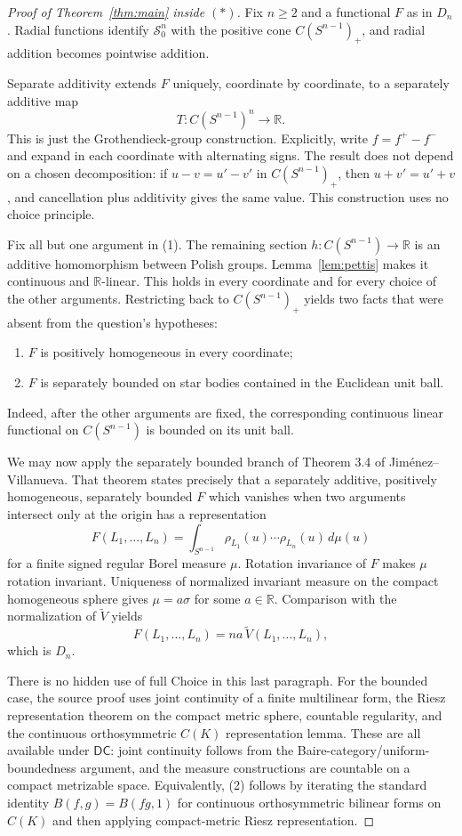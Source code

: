 \documentclass[11pt]{article}
\newcommand{\DC}{\mathsf{DC}}
\newcommand{\R}{\mathbb R}
\newcommand{\Sph}{S^{n-1}}
\newcommand{\C}{C(\Sph)}
\newcommand{\Vt}{\widetilde V}
\begin{document}
\begin{proof}[Proof of Theorem~\ref{thm:main} inside $(\ast)$]
Fix $n\ge2$ and a functional $F$ as in $D_n$.  Radial functions identify
$\mathcal S_0^n$ with the positive cone $\C_+$, and radial addition becomes
pointwise addition.

Separate additivity extends $F$ uniquely, coordinate by coordinate, to a
separately additive map
\[
 T:\C^n\longrightarrow\R.                                      \tag{1}
\]
This is just the Grothendieck-group construction.  Explicitly, write
$f=f^+-f^-$ and expand in each coordinate with alternating signs.  The result
does not depend on a chosen decomposition: if $u-v=u'-v'$ in $\C_+$, then
$u+v'=u'+v$, and cancellation plus additivity gives the same value.  This
construction uses no choice principle.

Fix all but one argument in (1).  The remaining section $h:\C\to\R$ is an
additive homomorphism between Polish groups.  Lemma~\ref{lem:pettis} makes it
continuous and $\R$-linear.  This holds in every coordinate and for every
choice of the other arguments.  Restricting back to $\C_+$ yields two facts
that were absent from the question's hypotheses:
\begin{enumerate}
\item $F$ is positively homogeneous in every coordinate;
\item $F$ is separately bounded on star bodies contained in the Euclidean
unit ball.
\end{enumerate}
Indeed, after the other arguments are fixed, the corresponding continuous
linear functional on $\C$ is bounded on its unit ball.

We may now apply the separately bounded branch of Theorem 3.4 of
Jim\'enez--Villanueva.  That theorem states precisely that a separately
additive, positively homogeneous, separately bounded $F$ which vanishes when
two arguments intersect only at the origin has a representation
\[
 F(L_1,\ldots,L_n)
   =\int_{\Sph}\rho_{L_1}(u)\cdots\rho_{L_n}(u)\,d\mu(u)          \tag{2}
\]
for a finite signed regular Borel measure $\mu$.  Rotation invariance of $F$
makes $\mu$ rotation invariant.  Uniqueness of normalized invariant measure
on the compact homogeneous sphere gives $\mu=a\sigma$ for some $a\in\R$.
Comparison with the normalization of $\Vt$ yields
\[
 F(L_1,\ldots,L_n)=na\,\Vt(L_1,\ldots,L_n),
\]
which is $D_n$.

There is no hidden use of full Choice in this last paragraph.  For the bounded
case, the source proof uses joint continuity of a finite multilinear form,
the Riesz representation theorem on the compact metric sphere, countable
regularity, and the continuous orthosymmetric $C(K)$ representation lemma.
These are all available under $\DC$: joint continuity follows from the
Baire-category/uniform-boundedness argument, and the measure constructions
are countable on a compact metrizable space.  Equivalently, (2) follows by
iterating the standard identity
$B(f,g)=B(fg,1)$ for continuous orthosymmetric bilinear forms on $C(K)$ and
then applying compact-metric Riesz representation.
\end{proof}
\end{document}
